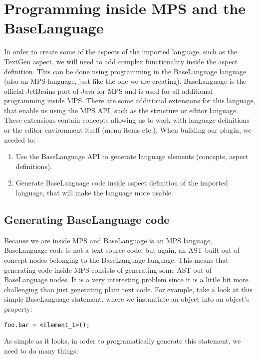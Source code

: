 \section{Programming inside MPS and the BaseLanguage}
\label{chap:generating_code_inside_mps}

In order to create some of the aspects of the imported language, such as the TextGen aspect, we will need to add complex functionality inside the aspect definition.
This can be done using programming in the BaseLanguage language (also an MPS language, just like the one we are creating).
BaseLanguage is the official JetBrains port of Java for MPS and is used for all additional programming inside MPS.
There are some additional extensions for this language, that enable us using the MPS API, such as the structure or editor language. 
These extensions contain concepts allowing us to work with language definitions or the editor environment itself (menu items etc.). 
When building our plugin, we needed to:

\begin{enumerate}
	\item Use the BaseLanguage API to generate language elements (concepts, aspect definitions).

	\item Generate BaseLanguage code inside aspect definition of the imported language, that will make the language more usable.
\end{enumerate}

\subsection{Generating BaseLanguage code}

Because we are inside MPS and BaseLanguage is an MPS language, BaseLanguage code is not a text source code, but again, an AST built out of concept nodes belonging to the BaseLanguage language.
This means that generating code inside MPS consists of generating some AST out of BaseLanguage nodes.
It is a very interesting problem since it is a little bit more challenging than just generating plain text code.
For example, take a look at this simple BaseLanguage statement, where we instantiate an object into an object's property:

\begin{center}
	\texttt{foo.bar = <Element{\_}1>();}
\end{center}

\noindent
As simple as it looks, in order to programatically generate this statement, we need to do many things:

